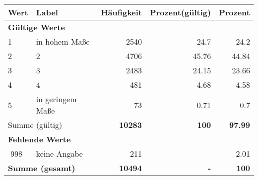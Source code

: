      \begin{longtable}{lXrrr}
     \toprule
     \textbf{Wert} & \textbf{Label} & \textbf{Häufigkeit} & \textbf{Prozent(gültig)} & \textbf{Prozent} \\
     \endhead
     \midrule
     \multicolumn{5}{l}{\textbf{Gültige Werte}}\\

     1 &
     \multicolumn{1}{X}{ in hohem Maße   } &


       \num{2540} &
       \num[round-mode=places,round-precision=2]{24,7} &
         \num[round-mode=places,round-precision=2]{24,2} \\

     2 &
     \multicolumn{1}{X}{ 2   } &


       \num{4706} &
       \num[round-mode=places,round-precision=2]{45,76} &
         \num[round-mode=places,round-precision=2]{44,84} \\

     3 &
     \multicolumn{1}{X}{ 3   } &


       \num{2483} &
       \num[round-mode=places,round-precision=2]{24,15} &
         \num[round-mode=places,round-precision=2]{23,66} \\

     4 &
     \multicolumn{1}{X}{ 4   } &


       \num{481} &
       \num[round-mode=places,round-precision=2]{4,68} &
         \num[round-mode=places,round-precision=2]{4,58} \\

     5 &
     \multicolumn{1}{X}{ in geringem Maße   } &


       \num{73} &
       \num[round-mode=places,round-precision=2]{0,71} &
         \num[round-mode=places,round-precision=2]{0,7} \\
     \midrule
     \multicolumn{2}{l}{Summe (gültig)} &
       \textbf{\num{10283}} &
     \textbf{100} &
       \textbf{\num[round-mode=places,round-precision=2]{97,99}} \\
     \multicolumn{5}{l}{\textbf{Fehlende Werte}}\\
       -998 &
       keine Angabe &
         \num{211} &
        - &
         \num[round-mode=places,round-precision=2]{2,01} \\
     \midrule
     \multicolumn{2}{l}{\textbf{Summe (gesamt)}} &
          \textbf{\num{10494}} &
        \textbf{-} &
        \textbf{100} \\
     \bottomrule
     \end{longtable}
     
